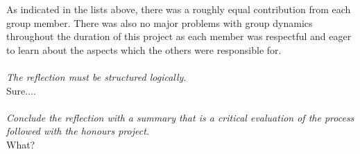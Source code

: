 \noindent As indicated in the lists above, there was a roughly equal contribution from each group member. There was also no major problems with group dynamics throughout the duration of this project as each member was respectful and eager to learn about the aspects which the others were responsible for.
\\\\
\indent \textit{The reflection must be structured logically.}
\\
Sure....
\\\\
\indent \textit{Conclude the reflection with a summary that is a critical evaluation of the process followed with the honours project.}
\\
What?
